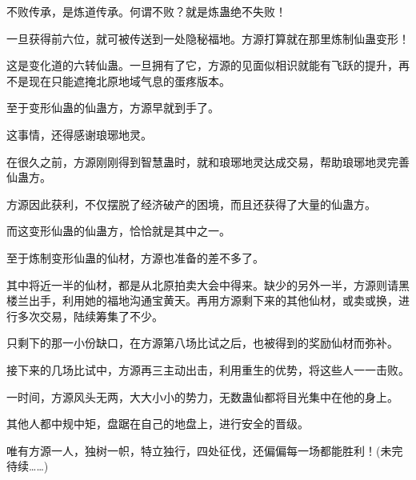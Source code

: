 \begin{this_body}
不败传承，是炼道传承。何谓不败？就是炼蛊绝不失败！

一旦获得前六位，就可被传送到一处隐秘福地。方源打算就在那里炼制仙蛊变形！

这是变化道的六转仙蛊。一旦拥有了它，方源的见面似相识就能有飞跃的提升，再不是现在只能遮掩北原地域气息的蛋疼版本。

至于变形仙蛊的仙蛊方，方源早就到手了。

这事情，还得感谢琅琊地灵。

在很久之前，方源刚刚得到智慧蛊时，就和琅琊地灵达成交易，帮助琅琊地灵完善仙蛊方。

方源因此获利，不仅摆脱了经济破产的困境，而且还获得了大量的仙蛊方。

而这变形仙蛊的仙蛊方，恰恰就是其中之一。

至于炼制变形仙蛊的仙材，方源也准备的差不多了。

其中将近一半的仙材，都是从北原拍卖大会中得来。缺少的另外一半，方源则请黑楼兰出手，利用她的福地沟通宝黄天。再用方源剩下来的其他仙材，或卖或换，进行多次交易，陆续筹集了不少。

只剩下的那一小份缺口，在方源第八场比试之后，也被得到的奖励仙材而弥补。

接下来的几场比试中，方源再三主动出击，利用重生的优势，将这些人一一击败。

一时间，方源风头无两，大大小小的势力，无数蛊仙都将目光集中在他的身上。

其他人都中规中矩，盘踞在自己的地盘上，进行安全的晋级。

唯有方源一人，独树一帜，特立独行，四处征伐，还偏偏每一场都能胜利！(未完待续……)

\end{this_body}


